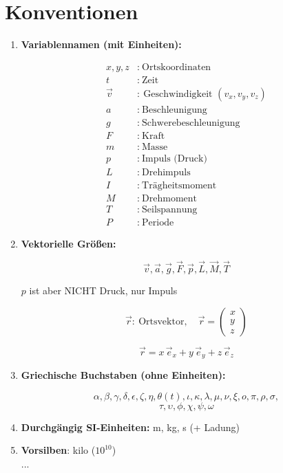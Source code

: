 \documentclass[a4paper,12pt]{article}
\begin{document}
\section*{Konventionen}

\begin{enumerate}

\item \textbf{Variablennamen (mit Einheiten):}

\begin{align*}
x, y, z &:\ \text{Ortskoordinaten} \\
t &:\ \text{Zeit} \\
\vec{v} &:\ \text{Geschwindigkeit } (v_x, v_y, v_z) \\
a &:\ \text{Beschleunigung} \\
g &:\ \text{Schwerebeschleunigung} \\
F &:\ \text{Kraft} \\
m &:\ \text{Masse} \\
p &:\ \text{Impuls (Druck)} \\
L &:\ \text{Drehimpuls} \\
I &:\ \text{Trägheitsmoment} \\
M &:\ \text{Drehmoment} \\
T &:\ \text{Seilspannung} \\
P &:\ \text{Periode}
\end{align*}

\item \textbf{Vektorielle Größen:}

\[
\vec{v}, \vec{a}, \vec{g}, \vec{F}, \vec{p}, \vec{L}, \vec{M}, \vec{T}
\]

$p$ ist aber NICHT Druck, nur Impuls

\[
\vec{r}:\ \text{Ortsvektor}, \quad 
\vec{r} =
\begin{pmatrix}
x \\ y \\ z
\end{pmatrix}
\]

\[
\vec{r} = x\,\vec{e}_x + y\,\vec{e}_y + z\,\vec{e}_z
\]

\item \textbf{Griechische Buchstaben (ohne Einheiten):}

\[
\alpha, \beta, \gamma, \delta, \epsilon, \zeta, \eta, \theta(t), \iota, \kappa, \lambda, \mu, \nu, \xi, o, \pi, \rho, \sigma,
\]
\[
\tau, \upsilon, \phi, \chi, \psi, \omega
\]



\item \textbf{Durchgängig SI-Einheiten:} 
 m, kg, s (+ Ladung) 


\item \textbf{Vorsilben}: 
kilo ($10 ^ {10}$)\\ 
... 

\end{enumerate}
\end{document}
